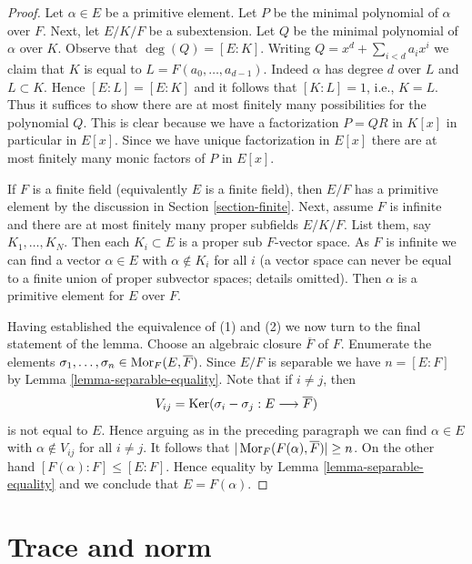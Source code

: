 \begin{proof}
Let $\alpha \in E$ be a primitive element. Let $P$ be the minimal
polynomial of $\alpha$ over $F$. Next, let $E/K/F$ be a subextension.
Let $Q$ be the minimal polynomial of $\alpha$ over $K$. Observe that
$\deg(Q) = [E : K]$. Writing $Q = x^d + \sum_{i < d} a_i x^i$ we claim that
$K$ is equal to $L = F(a_0, \ldots, a_{d - 1})$. Indeed $\alpha$ has degree
$d$ over $L$ and $L \subset K$. Hence $[E : L] = [E : K]$ and it follows
that $[K : L] = 1$, i.e., $K = L$.
Thus it suffices to show there are at most finitely many possibilities
for the polynomial $Q$. This is clear because we have a factorization
$P = QR$  in $K[x]$ in particular in $E[x]$. Since we have unique
factorization in $E[x]$ there are at most finitely many monic
factors of $P$ in $E[x]$.

\medskip\noindent
If $F$ is a finite field (equivalently $E$ is a finite field), then
$E/F$ has a primitive element by the discussion in
Section \ref{section-finite}.
Next, assume $F$ is infinite and there are at most finitely many proper
subfields $E/K/F$. List them, say $K_1, \ldots, K_N$. Then
each $K_i \subset E$ is a proper sub $F$-vector space. As $F$ is infinite
we can find a vector $\alpha \in E$ with $\alpha \not \in K_i$ for all $i$
(a vector space can never be equal to a finite union of proper subvector spaces;
details omitted). Then $\alpha$ is a primitive element for $E$ over $F$.

\medskip\noindent
Having established the equivalence of (1) and (2) we now turn to
the final statement of the lemma. Choose an algebraic closure
$\overline{F}$ of $F$. Enumerate the elements
$\sigma_1, \ldots, \sigma_n \in \mathop{\mathrm{Mor}}\nolimits_F(E, \overline{F})$.
Since $E/F$ is separable we have $n = [E : F]$ by
Lemma \ref{lemma-separable-equality}.
Note that if $i \not = j$, then
$$
V_{ij} = \mathop{\mathrm{Ker}}(\sigma_i - \sigma_j : E \longrightarrow \overline{F})
$$
is not equal to $E$. Hence arguing as in the preceding paragraph
we can find $\alpha \in E$ with $\alpha \not \in V_{ij}$ for all
$i \not = j$. It follows that $|\mathop{\mathrm{Mor}}\nolimits_F(F(\alpha), \overline{F})| \geq n$.
On the other hand $[F(\alpha) : F] \leq [E : F]$. Hence equality
by Lemma \ref{lemma-separable-equality}
and we conclude that $E = F(\alpha)$.
\end{proof}






\section{Trace and norm}
\label{section-trace-pairing}

